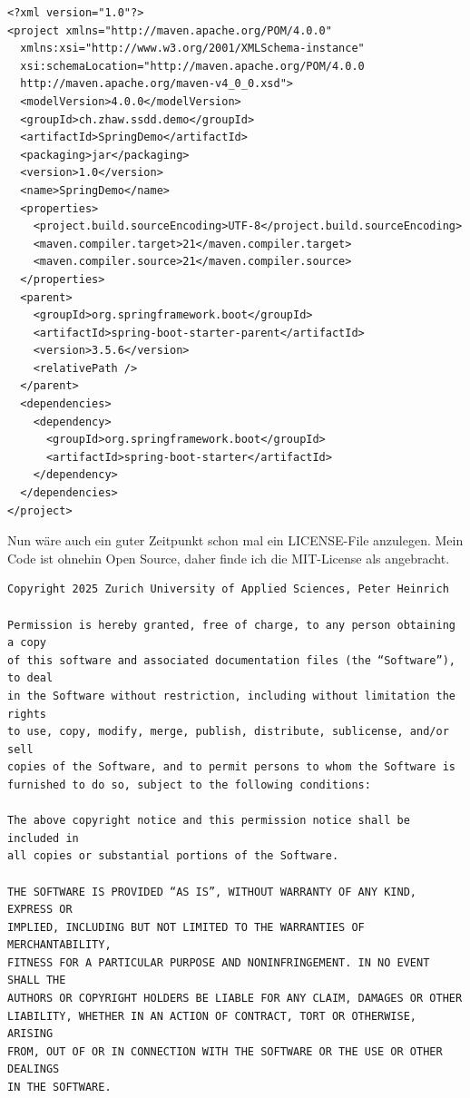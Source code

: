 \begin{listing}[H]
\begin{verbatim}
<?xml version="1.0"?>
<project xmlns="http://maven.apache.org/POM/4.0.0"
  xmlns:xsi="http://www.w3.org/2001/XMLSchema-instance"
  xsi:schemaLocation="http://maven.apache.org/POM/4.0.0 
  http://maven.apache.org/maven-v4_0_0.xsd">
  <modelVersion>4.0.0</modelVersion>
  <groupId>ch.zhaw.ssdd.demo</groupId>
  <artifactId>SpringDemo</artifactId>
  <packaging>jar</packaging>
  <version>1.0</version>
  <name>SpringDemo</name>
  <properties>
    <project.build.sourceEncoding>UTF-8</project.build.sourceEncoding>
    <maven.compiler.target>21</maven.compiler.target>
    <maven.compiler.source>21</maven.compiler.source>
  </properties>
  <parent>
    <groupId>org.springframework.boot</groupId>
    <artifactId>spring-boot-starter-parent</artifactId>
    <version>3.5.6</version>
    <relativePath />
  </parent>
  <dependencies>
    <dependency>
      <groupId>org.springframework.boot</groupId>
      <artifactId>spring-boot-starter</artifactId>
    </dependency>
  </dependencies>
</project>
\end{verbatim}
\caption{pom.xml in einer minimalen Ausführung}
\label{lst:pom.xml}
\end{listing}

Nun wäre auch ein guter Zeitpunkt schon mal ein LICENSE-File anzulegen.
Mein Code ist ohnehin Open Source, daher finde ich die MIT-License
als angebracht.

\begin{listing}[H]
\small
\begin{verbatim}
Copyright 2025 Zurich University of Applied Sciences, Peter Heinrich

Permission is hereby granted, free of charge, to any person obtaining a copy 
of this software and associated documentation files (the “Software”), to deal
in the Software without restriction, including without limitation the rights
to use, copy, modify, merge, publish, distribute, sublicense, and/or sell
copies of the Software, and to permit persons to whom the Software is
furnished to do so, subject to the following conditions:

The above copyright notice and this permission notice shall be included in
all copies or substantial portions of the Software.

THE SOFTWARE IS PROVIDED “AS IS”, WITHOUT WARRANTY OF ANY KIND, EXPRESS OR
IMPLIED, INCLUDING BUT NOT LIMITED TO THE WARRANTIES OF MERCHANTABILITY,
FITNESS FOR A PARTICULAR PURPOSE AND NONINFRINGEMENT. IN NO EVENT SHALL THE
AUTHORS OR COPYRIGHT HOLDERS BE LIABLE FOR ANY CLAIM, DAMAGES OR OTHER
LIABILITY, WHETHER IN AN ACTION OF CONTRACT, TORT OR OTHERWISE, ARISING
FROM, OUT OF OR IN CONNECTION WITH THE SOFTWARE OR THE USE OR OTHER DEALINGS
IN THE SOFTWARE.
\end{verbatim}
\caption{LICENSE}
\label{lst:license}
\end{listing}

